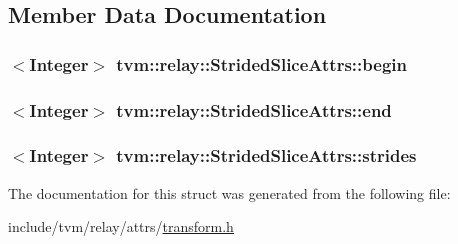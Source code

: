 \subsection{Member Data Documentation}
\subsubsection[{\texorpdfstring{begin}{begin}}]{$<${\bf Integer}$>$ tvm\+::relay\+::\+Strided\+Slice\+Attrs\+::begin}\hypertarget{structtvm_1_1relay_1_1StridedSliceAttrs_a4dabbcdfb8710c2ba212ae2795fa05d4}{}\label{structtvm_1_1relay_1_1StridedSliceAttrs_a4dabbcdfb8710c2ba212ae2795fa05d4}
\subsubsection[{\texorpdfstring{end}{end}}]{$<${\bf Integer}$>$ tvm\+::relay\+::\+Strided\+Slice\+Attrs\+::end}\hypertarget{structtvm_1_1relay_1_1StridedSliceAttrs_a242e9831b302266ecc07c0f123e996c4}{}\label{structtvm_1_1relay_1_1StridedSliceAttrs_a242e9831b302266ecc07c0f123e996c4}
\subsubsection[{\texorpdfstring{strides}{strides}}]{$<${\bf Integer}$>$ tvm\+::relay\+::\+Strided\+Slice\+Attrs\+::strides}\hypertarget{structtvm_1_1relay_1_1StridedSliceAttrs_ae609df80d9a3f1ac71edf959e7f1a986}{}\label{structtvm_1_1relay_1_1StridedSliceAttrs_ae609df80d9a3f1ac71edf959e7f1a986}


The documentation for this struct was generated from the following file\+:\begin{DoxyCompactItemize}
\item 
include/tvm/relay/attrs/\hyperlink{include_2tvm_2relay_2attrs_2transform_8h}{transform.\+h}\end{DoxyCompactItemize}
